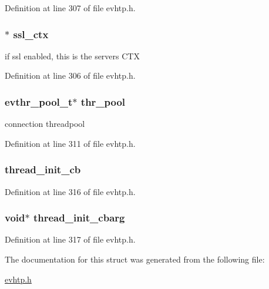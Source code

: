 Definition at line 307 of file evhtp.\-h.

\hypertarget{structevhtp__s_a21d5d9eef41ecdb08b82db795aa6da98}{
\subsubsection[{ssl\-\_\-ctx}]{$\ast$ ssl\-\_\-ctx}}\label{structevhtp__s_a21d5d9eef41ecdb08b82db795aa6da98}
if ssl enabled, this is the servers C\-T\-X 

Definition at line 306 of file evhtp.\-h.

\hypertarget{structevhtp__s_a350014aec537fdf8ef6f82efe17d5757}{
\subsubsection[{thr\-\_\-pool}]{\setlength{\rightskip}{0pt plus 5cm}evthr\-\_\-pool\-\_\-t$\ast$ thr\-\_\-pool}}\label{structevhtp__s_a350014aec537fdf8ef6f82efe17d5757}
connection threadpool 

Definition at line 311 of file evhtp.\-h.

\hypertarget{structevhtp__s_af7bcd46ddf1d6d7dde1383c28f746e97}{
\subsubsection[{thread\-\_\-init\-\_\-cb}]{ thread\-\_\-init\-\_\-cb}}\label{structevhtp__s_af7bcd46ddf1d6d7dde1383c28f746e97}


Definition at line 316 of file evhtp.\-h.

\hypertarget{structevhtp__s_aa7d8ed7967f5071085f57741dde79056}{
\subsubsection[{thread\-\_\-init\-\_\-cbarg}]{\setlength{\rightskip}{0pt plus 5cm}void$\ast$ thread\-\_\-init\-\_\-cbarg}}\label{structevhtp__s_aa7d8ed7967f5071085f57741dde79056}


Definition at line 317 of file evhtp.\-h.



The documentation for this struct was generated from the following file\-:\begin{DoxyCompactItemize}
\item 
\hyperlink{evhtp_8h}{evhtp.\-h}\end{DoxyCompactItemize}

